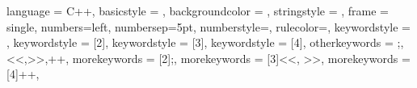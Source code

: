 {
	language = C++,
	basicstyle = {\ttfamily \color{main-color}},
	backgroundcolor = {\color{back-color}},
	stringstyle = {\color{string-color}},
	frame = single,
	numbers=left,
	numbersep=5pt,
	numberstyle=\tiny\color{black},
	rulecolor=\color{black},
	keywordstyle = {\color{key-color}},
	keywordstyle = [2]{\color{lime}},
	keywordstyle = [3]{\color{yellow}},
	keywordstyle = [4]{\color{teal}},
	otherkeywords = {;,<<,>>,++},
	morekeywords = [2]{;},
	morekeywords = [3]{<<, >>},
	morekeywords = [4]{++},
}


\let\Chaptermark\chaptermark
\def\chaptermark#1{\def\Chaptername{#1}\Chaptermark{#1}}
\let\Sectionmark\sectionmark
\def\sectionmark#1{\def\Sectionname{#1}\Sectionmark{#1}}
\let\Subsectionmark\subsectionmark
\def\subsectionmark#1{\def\Subsectionname{#1}\Subsectionmark{#1}}
\let\Subsubsectionmark\subsubsectionmark
\def\subsubsectionmark#1{\def\Subsubsectionname{#1}\Subsubsectionmark{#1}}
\setcounter{simul}{1}





